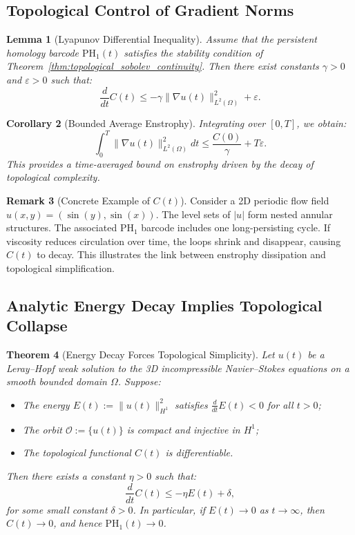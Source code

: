 \documentclass[11pt]{article}
\newtheorem{theorem}{Theorem}[section]
\newtheorem{lemma}[theorem]{Lemma}
\newtheorem{corollary}[theorem]{Corollary}
\theoremstyle{definition}
\newtheorem{remark}[theorem]{Remark}
\begin{document}
\subsection{Topological Control of Gradient Norms}

\begin{lemma}[Lyapunov Differential Inequality]
Assume that the persistent homology barcode $\mathrm{PH}_1(t)$ satisfies the stability condition of Theorem~\ref{thm:topological_sobolev_continuity}. Then there exist constants $\gamma > 0$ and $\varepsilon > 0$ such that:
\[
\frac{d}{dt} C(t) \leq -\gamma \|\nabla u(t)\|_{L^2(\Omega)}^2 + \varepsilon.
\]
\end{lemma}

\begin{corollary}[Bounded Average Enstrophy]
Integrating over $[0,T]$, we obtain:
\[
\int_0^T \|\nabla u(t)\|_{L^2(\Omega)}^2 dt \leq \frac{C(0)}{\gamma} + T\varepsilon.
\]
This provides a time-averaged bound on enstrophy driven by the decay of topological complexity.
\end{corollary}

\begin{remark}[Concrete Example of $C(t)$]
Consider a 2D periodic flow field $u(x,y) = (\sin(y), \sin(x))$. The level sets of $|u|$ form nested annular structures. The associated $\mathrm{PH}_1$ barcode includes one long-persisting cycle. If viscosity reduces circulation over time, the loops shrink and disappear, causing $C(t)$ to decay. This illustrates the link between enstrophy dissipation and topological simplification.
\end{remark}

\subsection{Analytic Energy Decay Implies Topological Collapse}

\begin{theorem}[Energy Decay Forces Topological Simplicity]
\label{thm:energy_topo}
Let $u(t)$ be a Leray–Hopf weak solution to the 3D incompressible Navier–Stokes equations on a smooth bounded domain $\Omega$. Suppose:
\begin{itemize}
    \item The energy $E(t) := \|u(t)\|_{H^1}^2$ satisfies $\frac{d}{dt} E(t) < 0$ for all $t > 0$;
    \item The orbit $\mathcal{O} := \{ u(t) \}$ is compact and injective in $H^1$;
    \item The topological functional $C(t)$ is differentiable.
\end{itemize}
Then there exists a constant $\eta > 0$ such that:
\[
\frac{d}{dt} C(t) \leq -\eta E(t) + \delta,
\]
for some small constant $\delta > 0$. In particular, if $E(t) \to 0$ as $t \to \infty$, then $C(t) \to 0$, and hence $\mathrm{PH}_1(t) \to 0$.
\end{theorem}
\end{document}
